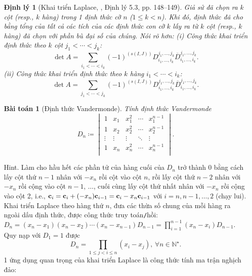 \documentclass{article}
\newtheorem{baitoan}{Bài toán}
\newtheorem{dinhly}{Định lý}
\begin{document}
\begin{dinhly}[Khai triển Laplace, \cite{Hung_linear_algebra}, Định lý 5.3, pp. 148--149]
	Giả sử đã chọn ra $k$ cột (resp., $k$ hàng) trong 1 định thức cỡ $n$ ($1\le k < n$). Khi đó, định thức đã cho bằng tổng của tất cả các tích của các định thức con cỡ $k$ lấy ra từ $k$ cột (resp., $k$ hàng) đã chọn với phần bù đại số của chúng. Nói rõ hơn: (i) Công thức khai triển định thức theo $k$ cột $j_1 < \cdots < j_k$:
	\begin{equation*}
		\det A = \sum_{i_1 < \cdots < i_k} (-1)^{(s(I,J))}D_{i_1,\ldots,i_k}^{j_1,\ldots,j_k}\overline{D}_{i_1,\ldots,i_k}^{j_1,\ldots,j_k}.
	\end{equation*}
	(ii) Công thức khai triển định thức theo $k$ hàng $i_1 < \cdots < i_k$:
	\begin{equation*}
		\det A = \sum_{j_1 < \cdots < j_k} (-1)^{(s(I,J))}D_{i_1,\ldots,i_k}^{j_1,\ldots,j_k}\overline{D}_{i_1,\ldots,i_k}^{j_1,\ldots,j_k}.
	\end{equation*}
\end{dinhly}

\begin{baitoan}[Định thức Vandermonde]
	Tính định thức Vandermonde
	\begin{equation*}
		D_n\coloneqq\begin{vmatrix}
			1 & x_1 & x_1^2 & \cdots & x_1^{n-1}\\
			1 & x_2 & x_2^2 & \cdots & x_2^{n-1}\\
			\vdots & \vdots & \vdots & \ddots & \vdots\\
			1 & x_n & x_n^2 & \cdots & x_n^{n-1}\\
		\end{vmatrix}.
	\end{equation*}
\end{baitoan}
{\sf Hint.} Làm cho hầu hết các phần tử của hàng cuối của $D_n$ trở thành 0 bằng cách lấy cột thứ $n - 1$ nhân với $-x_n$ rồi cột vào cột $n$, rồi lấy cột thứ $n - 2$ nhân với $-x_n$ rồi cộng vào cột $n - 1$, $\ldots$, cuối cùng lấy cột thứ nhất nhân với $-x_n$ rồi cộng vào cột 2, i.e., ${\bf c}_i = {\bf c}_i + (-x_n){\bf c}_{i-1} = {\bf c}_i - x_n{\bf c}_{i-1}$ với $i = n,n - 1,\ldots,2$ (chạy lui). Khai triển Laplace theo hàng thứ $n$, đưa các thừa số chung của mỗi hàng ra ngoài dấu định thức, được công thức truy toán{\tt/}hồi: $D_n = (x_n - x_1)(x_n - x_2)\cdots(x_n - x_{n-1})D_{n-1} = \prod_{i=1}^{n-1} (x_n - x_i)D_{n-1}$. Quy nạp với $D_1 = 1$ được
\begin{equation}
	\label{Vandermonde det}
	\tag{Vandermonde}
	D_n = \prod_{1\le j < i\le n} (x_i - x_j),\ \forall n\in\mathbb{N}^\star.
\end{equation}
1 ứng dụng quan trọng của khai triển Laplace là công thức tính ma trận nghịch đảo:
\end{document}
